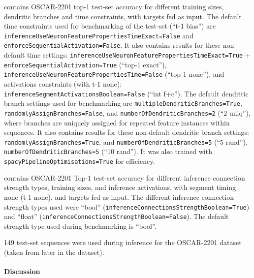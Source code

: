  contains OSCAR-2201 top-1 test-set accuracy for different training sizes, dendritic branches and time constraints, with targets fed as input. The default time constraints used for benchmarking of the test-set (``t-1 bias'') are \texttt{inferenceUseNeuronFeaturePropertiesTimeExact=False} and \texttt{enforceSequentialActivation=False}. It also contains results for these non-default time settings: \texttt{inferenceUseNeuronFeaturePropertiesTimeExact=True} + \texttt{enforceSequentialActivation=True} (``top-1 exact''), \texttt{inferenceUseNeuronFeaturePropertiesTime=False} (``top-1 none''), and activations constraints (with t-1 none): \texttt{inferenceSegmentActivationsBoolean=False} (``int f+c''). The default dendritic branch settings used for benchmarking are \texttt{multipleDendriticBranches=True}, \texttt{randomlyAssignBranches=False}, and \texttt{numberOfDendriticBranches=2} (``2 uniq''), where branches are uniquely assigned for repeated feature instances within sequences. It also contains results for these non-default dendritic branch settings: \texttt{randomlyAssignBranches=True}, and \texttt{numberOfDendriticBranches=5} (``5 rand''), \texttt{numberOfDendriticBranches=5} (``10 rand''). It was also trained with \texttt{spacyPipelineOptimisations=True} for efficiency.

 contains OSCAR-2201 Top-1 test-set accuracy for different inference connection strength types, training sizes, and inference activations, with segment timing none (t-1 none), and targets fed as input. The different inference connection strength types used were ``bool'' (\texttt{inferenceConnectionsStrengthBoolean=True}) and ``float'' (\texttt{inferenceConnectionsStrengthBoolean=False}). The default strength type used during benchmarking is ``bool''.

149 test-set sequences were used during inference for the OSCAR-2201 dataset (taken from later in the dataset).

\paragraph{Discussion}

